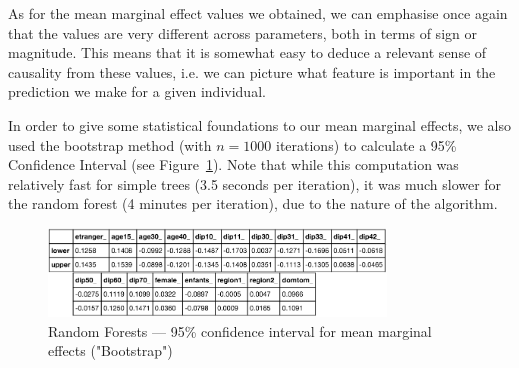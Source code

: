 As for the mean marginal effect values we obtained,  we can emphasise once again that the values are very different across parameters, both in terms of sign or magnitude. This means that it is somewhat easy to deduce a relevant sense of causality from these values, i.e. we can picture what feature is important in the prediction we make for a given individual.

In order to give some statistical foundations to our mean marginal effects, we also used the bootstrap method (with $n=1000$ iterations) to calculate a 95\% Confidence Interval (see Figure~\ref{fig:random_forest_bootstrap}). Note that while this computation was relatively fast for simple trees (3.5 seconds per iteration), it was much slower for the random forest (4 minutes per iteration), due to the nature of the algorithm.

\begin{figure}
    \centering
    \includegraphics[width=0.8\textwidth]{img/random_forest_bootstrap.png}
    \caption{Random Forests --- 95\% confidence interval for mean marginal effects ("Bootstrap")}
    \label{fig:random_forest_bootstrap}
\end{figure}



